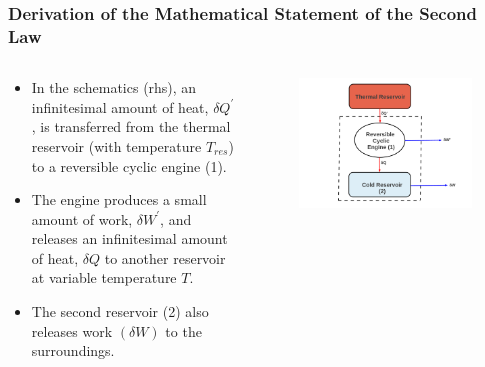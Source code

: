 \documentclass[10pt,compress,handout,ignorenonframetext]{beamer}
\begin{document}
\begin{frame}
 \frametitle{Derivation of the Mathematical Statement of the Second Law}
 \begin{columns}

  \begin{column}[c]{0.5\linewidth}
   \begin{itemize}
    \item <2-> In the schematics (rhs), an infinitesimal amount of heat, $\delta Q^{\prime}$, is transferred from the thermal reservoir (with temperature $T_{res}$) to a reversible cyclic engine (1). 
    \item <3-> The engine produces a small amount of work, $\delta W^{\prime}$, and releases an infinitesimal amount of heat, $\delta Q$ to another reservoir at variable temperature $T$. 
    \item <4-> The second reservoir (2) also releases work $\left(\delta W\right)$ to the surroundings.
   \end{itemize}


  \end{column}

  \begin{column}[c]{0.5\linewidth}
   \begin{figure}%
    \begin{center}
     \includegraphics[width=1.\columnwidth,clip]{./Pics/2ndLaw_Schem2}
    \end{center}
   \end{figure} 
  \end{column}
 \end{columns}


 \normalsize
    
\end{frame}
\end{document}
